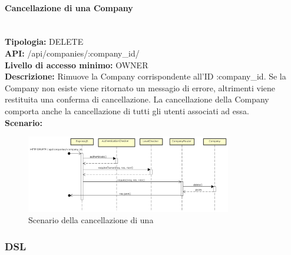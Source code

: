 \newpage
\paragraph{Cancellazione di una Company}\mbox{}\\
\textbf{Tipologia:} DELETE \\
\textbf{API:} /api/companies/:company\_id/ \\
\textbf{Livello di accesso minimo:} OWNER \\
\textbf{Descrizione:} Rimuove la Company corrispondente all'ID :company\_id. Se la Company non esiste viene ritornato un messagio di errore, altrimenti viene restituita una conferma di cancellazione. La cancellazione della Company comporta anche la cancellazione di tutti gli utenti associati ad essa. \\
\textbf{Scenario:} 
\begin{figure}[H]
\centering
\includegraphics[width=0.8\textwidth]{res/sections/backend/sequence/(DELETE)company.png}
\caption{Scenario della cancellazione di una }
\end{figure}

\newpage
\subsubsection{DSL}
